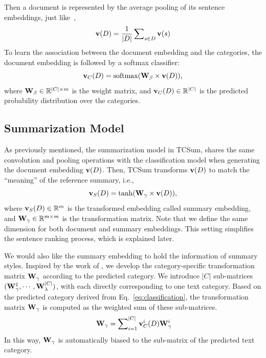 \documentclass[letterpaper]{article}
\begin{document}
Then a document is represented by the average pooling of its sentence embeddings, just like~\cite{lai2015recurrent},
\begin{equation} \label{eq:documentEmbedding}
{\bf{v}}(D) = \frac{1}{{|D|}}\sum\nolimits_{s \in D} {{\bf{v}}(s)}
\end{equation}
To learn the association between the document embedding and the categories, the document embedding is followed by a softmax classifier:
\begin{equation}\label{eq:classification}
{\bf{v}}_C(D) = {\rm{softmax}}({{\bf{W}}_\beta} \times {\bf{v}}(D)),
\end{equation}
where ${{\bf{W}}_\beta} \in \mathbb{R}^{|C| \times m}$ is the weight matrix, and ${\bf{v}}_C(D) \in \mathbb{R}^{|C|}$ is the predicted probability distribution over the categories.




\subsection{Summarization Model}
As previously mentioned, the summarization model in TCSum, shares the same convolution and pooling operations with the classification model when generating the document embedding ${\bf{v}}(D)$.
Then, TCSum transforms ${\bf{v}}(D)$ to match the ``meaning'' of the reference summary, i.e.,
\begin{equation}
{\bf{v}}_S(D) = {\rm{tanh}}({{\bf{W}}_\gamma} \times {\bf{v}}(D)),
\end{equation}
where ${\bf{v}}_S(D) \in \mathbb{R}^m$ is the transformed embedding called summary embedding, and ${\bf{W}}_\gamma \in \mathbb{R}^{m \times m}$ is the transformation matrix.
Note that we define the same dimension for both document and summary embeddings.
This setting simplifies the sentence ranking process, which is explained later.

We would also like the summary embedding to hold the information of summary styles.
Inspired by the work of \cite{dong2014adaptive}, we develop the category-specific transformation matrix ${\bf{W}}_\gamma$ according to the predicted category.
We introduce $|C|$ sub-matrices $({\bf{W}}_\gamma ^1, \cdots ,{\bf{W}}_\lambda ^{|C|})$, with each directly corresponding to one text category.
Based on the predicted category derived from Eq.~\ref{eq:classification}, the transformation matrix ${\bf{W}}_\gamma$ is computed as the weighted sum of these sub-matrices.
\begin{equation}~\label{eq:adaptive}
{{\bf{W}}_\gamma } = \sum\nolimits_{i = 1}^{|C|} {{\bf{v}}_C^i(D)} {\bf{W}}_\gamma ^i
\end{equation}
In this way, ${{\bf{W}}_\gamma }$ is automatically biased to the sub-matrix of the predicted text category.
\end{document}
